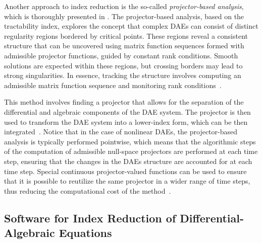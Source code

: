 Another approach to index reduction is the so-called \emph{projector-based analysis}, which is thoroughly presented in \citet{lamour2013differential, marz2014differential}. The projector-based analysis, based on the tractability index, explores the concept that complex \acp{DAE} can consist of distinct regularity regions bordered by critical points. These regions reveal a consistent structure that can be uncovered using matrix function sequences formed with admissible projector functions, guided by constant rank conditions. Smooth solutions are expected within these regions, but crossing borders may lead to strong singularities. In essence, tracking the structure involves computing an admissible matrix function sequence and monitoring rank conditions~\cite{lamour2011computational}.

This method involves finding a projector that allows for the separation of the differential and algebraic components of the \ac{DAE} system. The projector is then used to transform the \ac{DAE} system into a lower-index form, which can be then integrated~\cite{lamour2011computational}. Notice that in the case of nonlinear \acp{DAE}, the projector-based analysis is typically performed pointwise, which means that the algorithmic steps of the computation of admissible null-space projectors are performed at each time step, ensuring that the changes in the \acp{DAE} structure are accounted for at each time step. Special continuous projector-valued functions can be used to ensure that it is possible to reutilize the same projector in a wider range of time steps, thus reducing the computational cost of the method~\cite{lamour2012detecting}.

\subsection{Software for Index Reduction of Differential-Algebraic Equations}

